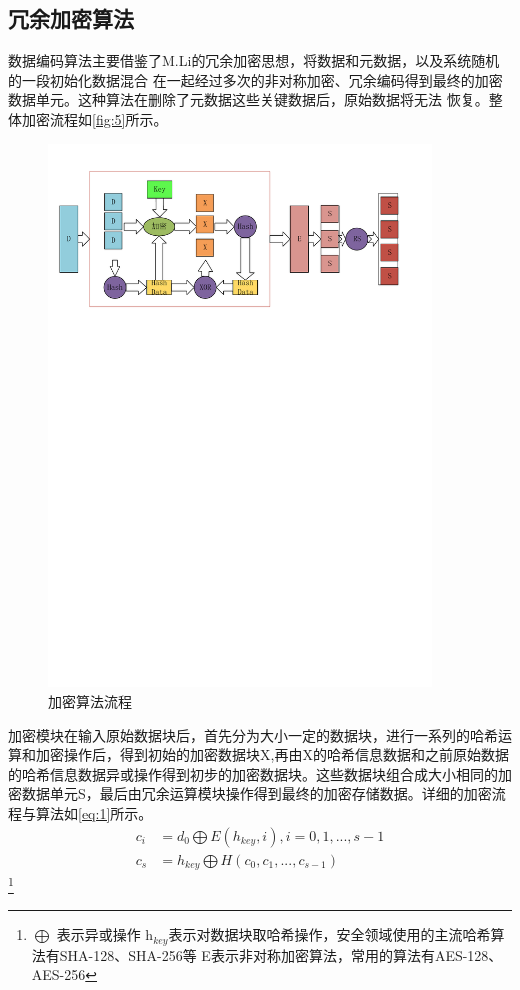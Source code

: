 \subsection{冗余加密算法}
数据编码算法主要借鉴了M.Li\cite{Li2014Convergent}的冗余加密思想，将数据和元数据，以及系统随机的一段初始化数据混合
在一起经过多次的非对称加密、冗余编码得到最终的加密数据单元。这种算法在删除了元数据这些关键数据后，原始数据将无法
恢复。整体加密流程如\autoref{fig:5}所示。
\begin{figure}[H]
	\centering
	\includegraphics[width=4in]{Pics/encrypt.pdf}
	\caption{加密算法流程}\label{fig:5}
\end{figure}
加密模块在输入原始数据块后，首先分为大小一定的数据块，进行一系列的哈希运算和加密操作后，得到初始的加密数据块X,再由X的哈希信息数据和之前原始数据的哈希信息数据异或操作得到初步的加密数据块。这些数据块组合成大小相同的加密数据单元S，最后由冗余运算模块操作得到最终的加密存储数据。详细的加密流程与算法如\autoref{eq:1}所示。
\begin{equation}
    \label{eq:1}
    \begin{aligned}
        c_{i} &=d_{0} \bigoplus E(h_{key},i),i=0,1,...,s-1 \\ %
        c_{s} &=h_{key} \bigoplus H(c_0,c_1,...,c_{s-1})     
    \end{aligned}
\end{equation}
\footnote{$\bigoplus$ 表示异或操作
\newline h$_{key}$表示对数据块取哈希操作，安全领域使用的主流哈希算法有SHA-128、SHA-256等
\newline E表示非对称加密算法，常用的算法有AES-128、AES-256
}

